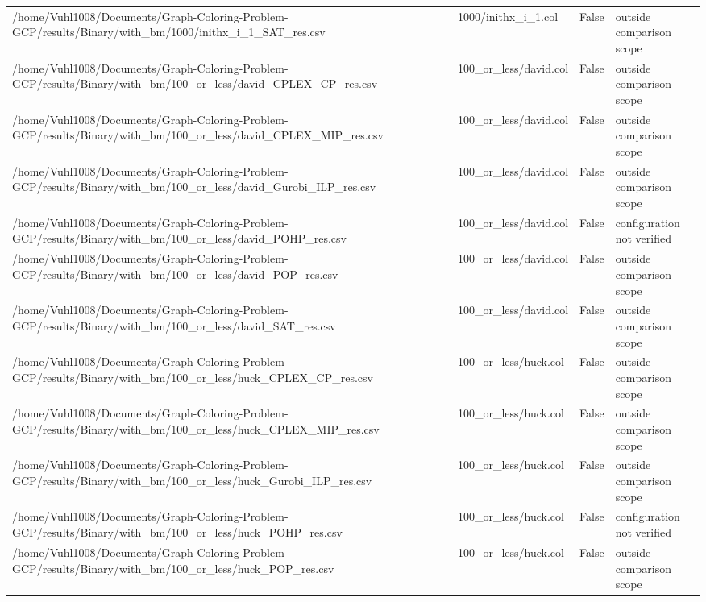 \begin{table}[htbp]
\begin{tabular}{llll}
/home/Vuhl1008/Documents/Graph-Coloring-Problem-GCP/results/Binary/with\_bm/1000/inithx\_i\_1\_SAT\_res.csv & 1000/inithx\_i\_1.col & False & outside comparison scope \\
/home/Vuhl1008/Documents/Graph-Coloring-Problem-GCP/results/Binary/with\_bm/100\_or\_less/david\_CPLEX\_CP\_res.csv & 100\_or\_less/david.col & False & outside comparison scope \\
/home/Vuhl1008/Documents/Graph-Coloring-Problem-GCP/results/Binary/with\_bm/100\_or\_less/david\_CPLEX\_MIP\_res.csv & 100\_or\_less/david.col & False & outside comparison scope \\
/home/Vuhl1008/Documents/Graph-Coloring-Problem-GCP/results/Binary/with\_bm/100\_or\_less/david\_Gurobi\_ILP\_res.csv & 100\_or\_less/david.col & False & outside comparison scope \\
/home/Vuhl1008/Documents/Graph-Coloring-Problem-GCP/results/Binary/with\_bm/100\_or\_less/david\_POHP\_res.csv & 100\_or\_less/david.col & False & configuration not verified \\
/home/Vuhl1008/Documents/Graph-Coloring-Problem-GCP/results/Binary/with\_bm/100\_or\_less/david\_POP\_res.csv & 100\_or\_less/david.col & False & outside comparison scope \\
/home/Vuhl1008/Documents/Graph-Coloring-Problem-GCP/results/Binary/with\_bm/100\_or\_less/david\_SAT\_res.csv & 100\_or\_less/david.col & False & outside comparison scope \\
/home/Vuhl1008/Documents/Graph-Coloring-Problem-GCP/results/Binary/with\_bm/100\_or\_less/huck\_CPLEX\_CP\_res.csv & 100\_or\_less/huck.col & False & outside comparison scope \\
/home/Vuhl1008/Documents/Graph-Coloring-Problem-GCP/results/Binary/with\_bm/100\_or\_less/huck\_CPLEX\_MIP\_res.csv & 100\_or\_less/huck.col & False & outside comparison scope \\
/home/Vuhl1008/Documents/Graph-Coloring-Problem-GCP/results/Binary/with\_bm/100\_or\_less/huck\_Gurobi\_ILP\_res.csv & 100\_or\_less/huck.col & False & outside comparison scope \\
/home/Vuhl1008/Documents/Graph-Coloring-Problem-GCP/results/Binary/with\_bm/100\_or\_less/huck\_POHP\_res.csv & 100\_or\_less/huck.col & False & configuration not verified \\
/home/Vuhl1008/Documents/Graph-Coloring-Problem-GCP/results/Binary/with\_bm/100\_or\_less/huck\_POP\_res.csv & 100\_or\_less/huck.col & False & outside comparison scope \\

\end{tabular}
\end{table}

